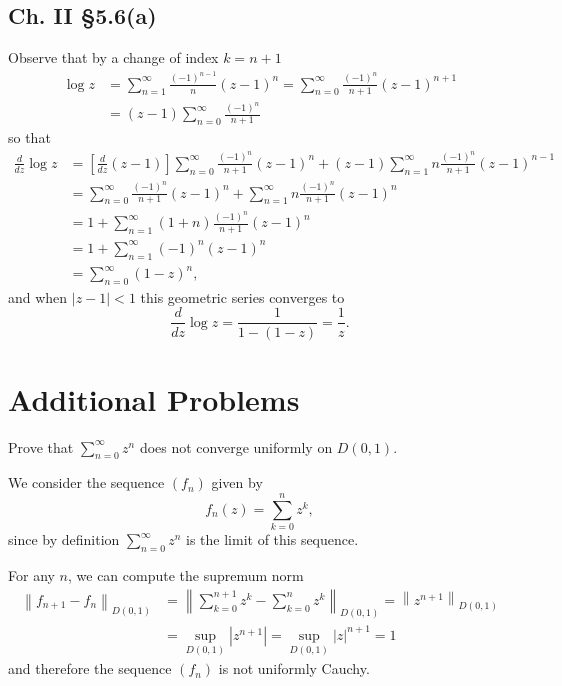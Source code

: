 \documentclass{article}
\newcounter{Problem}
\newenvironment{Problem}{\begin{Exercise}[name={Problem},
                                          counter={Problem}]}
                        {\end{Exercise}}
\begin{document}
\subsection*{Ch. II \S 5.6(a)}
Observe that by a change of index $k = n+1$
\begin{align*}
   \log z
&= \sum_{n=1}^\infty \frac{(-1)^{n-1}}{n}(z-1)^n
 = \sum_{n=0}^\infty \frac{(-1)^n}{n+1} (z-1)^{n+1} \\
&= (z-1)\sum_{n=0}^\infty \frac{(-1)^n}{n+1}
\end{align*}
so that
\begin{align*}
   \frac{d}{dz} \log z
&= \left[\frac{d}{dz} (z-1)\right]
   \sum_{n=0}^\infty \frac{(-1)^n}{n+1} (z-1)^n
 + (z-1)\sum_{n=1}^\infty n\frac{(-1)^n}{n+1} (z - 1)^{n-1} \\
&= \sum_{n=0}^\infty \frac{(-1)^n}{n+1} (z-1)^n
 + \sum_{n=1}^\infty n \frac{(-1)^n}{n+1} (z-1)^n \\
&= 1 + \sum_{n=1}^\infty (1 + n) \frac{(-1)^n}{n+1} (z-1)^n \\
&= 1 + \sum_{n=1}^\infty (-1)^n (z-1)^n \\
&= \sum_{n=0}^\infty (1-z)^n,
\end{align*}
and when $|z - 1| < 1$ this geometric series converges to
$$
\frac{d}{dz} \log z = \frac{1}{1 - (1 - z)} = \frac{1}{z}.
$$

\section{Additional Problems}

\begin{Problem}
  Prove that $\sum_{n=0}^\infty z^n$ does not converge uniformly on
  $D(0, 1)$.
\end{Problem}

\begin{Answer}
  We consider the sequence $(f_n)$ given by
  $$
  f_n(z) = \sum_{k=0}^n z^k,
  $$
  since by definition $\sum_{n=0}^\infty z^n$ is the limit
  of this sequence.

  For any $n$, we can compute the supremum norm
  \begin{align*}
    \left\|
      f_{n+1} - f_n
    \right\|_{D(0,1)}
  &=
    \left\|
      \sum_{k=0}^{n+1} z^k
    - \sum_{k=0}^{n} z^k
    \right\|_{D(0,1)}
   =
  \left\|
    z^{n+1}
  \right\|_{D(0,1)} \\
  &=
  \sup_{D(0,1)} |z^{n+1}|
   =
  \sup_{D(0,1)} |z|^{n+1}
   = 1
  \end{align*}
  and therefore the sequence $(f_n)$ is not uniformly
  Cauchy.
\end{Answer}
\end{document}
